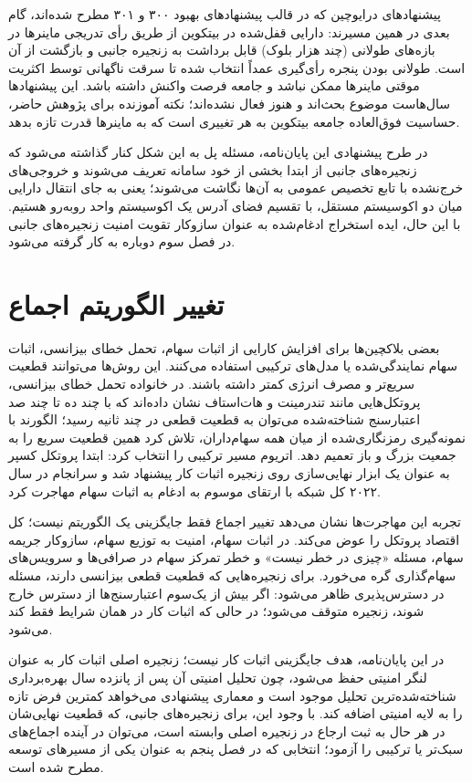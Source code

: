 پیشنهادهای درایوچین که در قالب پیشنهادهای بهبود ۳۰۰ و ۳۰۱ مطرح شده‌اند، گام بعدی در همین مسیرند: دارایی قفل‌شده در بیتکوین از طریق رأی تدریجی ماینرها در بازه‌های طولانی (چند هزار بلوک) قابل برداشت به زنجیره جانبی و بازگشت از آن است. طولانی بودن پنجره رأی‌گیری عمداً انتخاب شده تا سرقت ناگهانی توسط اکثریت موقتی ماینرها ممکن نباشد و جامعه فرصت واکنش داشته باشد. این پیشنهادها سال‌هاست موضوع بحث‌اند و هنوز فعال نشده‌اند؛ نکته آموزنده برای پژوهش حاضر، حساسیت فوق‌العاده جامعه بیتکوین به هر تغییری است که به ماینرها قدرت تازه بدهد.

در طرح پیشنهادی این پایان‌نامه، مسئله پل به این شکل کنار گذاشته می‌شود که زنجیره‌های جانبی از ابتدا بخشی از خود سامانه تعریف می‌شوند و خروجی‌های خرج‌نشده با تابع تخصیص عمومی به آن‌ها نگاشت می‌شوند؛ یعنی به جای انتقال دارایی میان دو اکوسیستم مستقل، با تقسیم فضای آدرس یک اکوسیستم واحد روبه‌رو هستیم. با این حال، ایده استخراج ادغام‌شده به عنوان سازوکار تقویت امنیت زنجیره‌های جانبی در فصل سوم دوباره به کار گرفته می‌شود.

\section{تغییر الگوریتم اجماع}

بعضی بلاکچین‌ها برای افزایش کارایی از اثبات سهام، تحمل خطای بیزانسی، اثبات سهام نمایندگی‌شده یا مدل‌های ترکیبی استفاده می‌کنند. این روش‌ها می‌توانند قطعیت سریع‌تر و مصرف انرژی کمتر داشته باشند. در خانواده تحمل خطای بیزانسی، پروتکل‌هایی مانند تندرمینت و هات‌استاف نشان داده‌اند که با چند ده تا چند صد اعتبارسنج شناخته‌شده می‌توان به قطعیت قطعی در چند ثانیه رسید؛ الگورند با نمونه‌گیری رمزنگاری‌شده از میان همه سهام‌داران، تلاش کرد همین قطعیت سریع را به جمعیت بزرگ و باز تعمیم دهد. اتریوم مسیر ترکیبی را انتخاب کرد: ابتدا پروتکل کسپر به عنوان یک ابزار نهایی‌سازی روی زنجیره اثبات کار پیشنهاد شد و سرانجام در سال ۲۰۲۲ کل شبکه با ارتقای موسوم به ادغام به اثبات سهام مهاجرت کرد.

تجربه این مهاجرت‌ها نشان می‌دهد تغییر اجماع فقط جایگزینی یک الگوریتم نیست؛ کل اقتصاد پروتکل را عوض می‌کند. در اثبات سهام، امنیت به توزیع سهام، سازوکار جریمه سهام، مسئله «چیزی در خطر نیست» و خطر تمرکز سهام در صرافی‌ها و سرویس‌های سهام‌گذاری گره می‌خورد. برای زنجیره‌هایی که قطعیت قطعی بیزانسی دارند، مسئله در دسترس‌پذیری ظاهر می‌شود: اگر بیش از یک‌سوم اعتبارسنج‌ها از دسترس خارج شوند، زنجیره متوقف می‌شود؛ در حالی که اثبات کار در همان شرایط فقط کند می‌شود.

در این پایان‌نامه، هدف جایگزینی اثبات کار نیست؛ زنجیره اصلی اثبات کار به عنوان لنگر امنیتی حفظ می‌شود، چون تحلیل امنیتی آن پس از پانزده سال بهره‌برداری شناخته‌شده‌ترین تحلیل موجود است و معماری پیشنهادی می‌خواهد کمترین فرض تازه را به لایه امنیتی اضافه کند. با وجود این، برای زنجیره‌های جانبی، که قطعیت نهایی‌شان در هر حال به ثبت ارجاع در زنجیره اصلی وابسته است، می‌توان در آینده اجماع‌های سبک‌تر یا ترکیبی را آزمود؛ انتخابی که در فصل پنجم به عنوان یکی از مسیرهای توسعه مطرح شده است.
